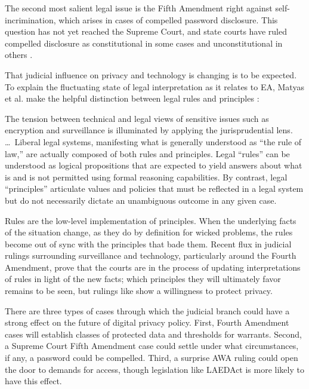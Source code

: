 The second most salient legal issue is the Fifth Amendment right against self-incrimination, which arises in cases of
compelled password disclosure. This question has not yet reached the Supreme Court, and state courts have ruled
compelled disclosure as constitutional in some cases \cite{sobel_2019} \cite{lee_nj_2020} and unconstitutional in others
\cite{lee_its_2020} \cite{vaas_2019}.

That judicial influence on privacy and technology is changing is to be expected. To explain the fluctuating state of
legal interpretation as it relates to \ac{EA}, Matyas et al. make the helpful distinction between legal rules and
principles \cite{matyas_incommensurability_2018}:

\begin{displayquote}
The tension between technical and legal views of sensitive issues such as encryption and surveillance is illuminated by
applying the jurisprudential lens. \dots~Liberal legal systems, manifesting what is generally understood as ``the rule
of law,'' are actually composed of both rules and principles. Legal ``rules'' can be understood as logical propositions
that are expected to yield answers about what is and is not permitted using formal reasoning capabilities. By contrast,
legal ``principles'' articulate values and policies that must be reflected in a legal system but do not necessarily
dictate an unambiguous outcome in any given case.
\end{displayquote}

Rules are the low-level implementation of principles. When the underlying facts of the situation change, as they do by
definition for wicked problems, the rules become out of sync with the principles that bade them. Recent flux in judicial
rulings surrounding surveillance and technology, particularly around the Fourth Amendment, prove that the courts are in
the process of updating interpretations of rules in light of the new facts; which principles they will ultimately favor
remains to be seen, but rulings like  show a willingness to protect privacy.

There are three types of cases through which the judicial branch could have a strong effect on the future of digital
privacy policy. First, Fourth Amendment cases will establish classes of protected data and thresholds for warrants.
Second, a Supreme Court Fifth Amendment case could settle under what circumstances, if any, a password could be
compelled. Third, a surprise \ac{AWA} ruling could open the door to demands for access, though legislation like
\ac{LAEDAct} is more likely to have this effect.



